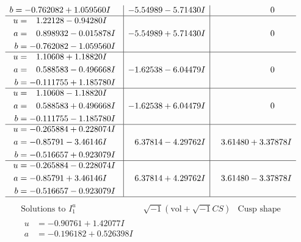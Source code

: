 \documentclass[1p]{elsarticle_modified}
\theoremstyle{definition}
\newcommand{\I}{\sqrt{-1}}
\begin{document}
$$\begin{array}{c|c|c}
\begin{aligned}
b &= -0.762082 + 1.059560 I\end{aligned}
 & -5.54989 - 5.71430 I & \phantom{-0.000000 } 0 \\ \hline\begin{aligned}
u &= \phantom{-}1.22128 - 0.94280 I \\
a &= \phantom{-}0.898932 - 0.015878 I \\
b &= -0.762082 - 1.059560 I\end{aligned}
 & -5.54989 + 5.71430 I & \phantom{-0.000000 } 0 \\ \hline\begin{aligned}
u &= \phantom{-}1.10608 + 1.18820 I \\
a &= \phantom{-}0.588583 - 0.496668 I \\
b &= -0.111755 + 1.185780 I\end{aligned}
 & -1.62538 - 6.04479 I & \phantom{-0.000000 } 0 \\ \hline\begin{aligned}
u &= \phantom{-}1.10608 - 1.18820 I \\
a &= \phantom{-}0.588583 + 0.496668 I \\
b &= -0.111755 - 1.185780 I\end{aligned}
 & -1.62538 + 6.04479 I & \phantom{-0.000000 } 0 \\ \hline\begin{aligned}
u &= -0.265884 + 0.228074 I \\
a &= -0.85791 - 3.46146 I \\
b &= -0.516657 + 0.923079 I\end{aligned}
 & \phantom{-}6.37814 - 4.29762 I & \phantom{-}3.61480 + 3.37878 I \\ \hline\begin{aligned}
u &= -0.265884 - 0.228074 I \\
a &= -0.85791 + 3.46146 I \\
b &= -0.516657 - 0.923079 I\end{aligned}
 & \phantom{-}6.37814 + 4.29762 I & \phantom{-}3.61480 - 3.37878 I\\
 \hline 
 \end{array}$$\newpage$$\begin{array}{c|c|c}  
\text{Solutions to }I^u_{1}& \I (\text{vol} + \sqrt{-1}CS) & \text{Cusp shape}\\
 \hline 
\begin{aligned}
u &= -0.90761 + 1.42077 I \\
a &= -0.196182 + 0.526398 I \\

\end{aligned}
\end{array}$$
\end{document}
